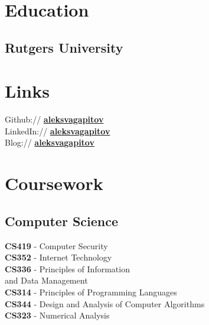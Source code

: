 \documentclass[]{Resume}
\begin{document}
\begin{minipage}[t]{0.33\textwidth} 


\section{Education} 

\subsection{Rutgers University}



\section{Links} 
Github:// \href{https://github.com/aleksvagapitov}{\bf aleksvagapitov} \\
LinkedIn://  \href{https://www.linkedin.com/in/aleksvagapitov}{\bf aleksvagapitov} \\
Blog://  \href{https://aleksvagapitov.github.io}{\bf aleksvagapitov}


\section{Coursework}

\subsection{Computer Science}
\sectionsep
\textbf{CS419} - Computer Security \\
\textbf{CS352} - Internet Technology \\
\textbf{CS336} - Principles of Information \\
and Data Management \\
\textbf{CS314} - Principles of Programming Languages \\
\textbf{CS344} - Design and Analysis of Computer Algorithms \\
\textbf{CS323} - Numerical Analysis \\


\end{minipage}
\end{document}
